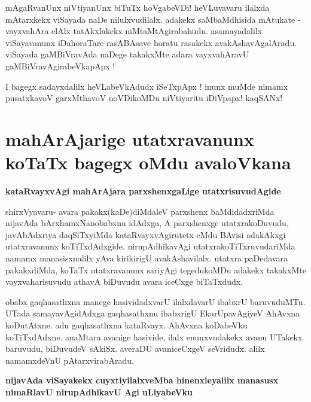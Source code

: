 \noindent
mAgaRvanUnx niVtiyanUnx biTuTx hoVgabeVDi! heVLuvavaru ilalxda mAtarxkekx viSayada naDe nilulxvudilalx. adakekx saMbaMdhisida mAtukate - vayxvahAra elAlx tatAkxlakekx niMtaMtAgirabahudu. asamayadalilx viSayavanunx iDahoraTare rasABAsave horatu rasakekx avakAshavAgalAradu. viSayada gaMBiVravAda naDege takakxMte adara vayxvahAravU gaMBiVravAgirabeVkapApx !

I bagegx sadayxdalilx heVLabeVkAdudx iSeTxpApx ! inunx muMde nimamx pusatxkavoV garxMthavoV noVDikoMDu niVtiyaritu iDiVpapx! kaqSANx!

\bigskip

\chapter{mahArAjarige utatxravanunx koTaTx bagegx oMdu avaloVkana}

{\bigskip
\noindent
{\large\bf kataRvayxvAgi mahArAjara parxshenxgaLige utatxrisuvudAgide}}\label{page250}
\medskip

\noindent
shirxVyavaru- avara pakakx(kaDe)diMdaleV parxshenx baMdidadxriMda nijavAda bArxhamxNanobabxnu idAdxga, A parxshenxge utatxrakoDuvudu, javAbAdxriya daqSiTxyiMda kataRvayxvAgirutetx eMdu BAvisi adakAkxgi utatxravanunx koTiTxdAdxgide. nirupAdhikavAgi utatxrakoTiTxruvudariMda namamx manasisxnalilx yAva kirikirigU avakAshavilalx. utatxra paDedavara pakakxdiMda, koTaTx utatxravanunx  sariyAgi tegedukoMDu adakekx takakxMte vayxvaharisuvudu athavA biDuvudu avara iceCxge biTaTxdudx.

obabx gaqhasathxna manege hasividadxvarU ilalxdavarU ibabxrU baruvuduMTu. UTada samayavAgidAdxga gaqhasathxnu ibabxrigU EkarUpavAgiyeV AhAvxna koDutAtxne. adu gaqhasathxna kataRvayx. AhAvxna koDabeVku koTiTxdAdxne. anaMtara avanige hasivide, ilalx enunxvudakekx avanu UTakekx baruvudu, biDuvudeV sAkiSx. averaDU avaniceCxgeV seVridudx. alilx namamxdeVnU pAtarxvirabAradu.

{\bigskip
\noindent
{\large\bf nijavAda viSayakekx cuyxtiyilalxveMba hinenxleyalilx manasusx nimaRlavU nirupAdhikavU Agi uLiyabeVku}}\label{page250b}
\medskip

